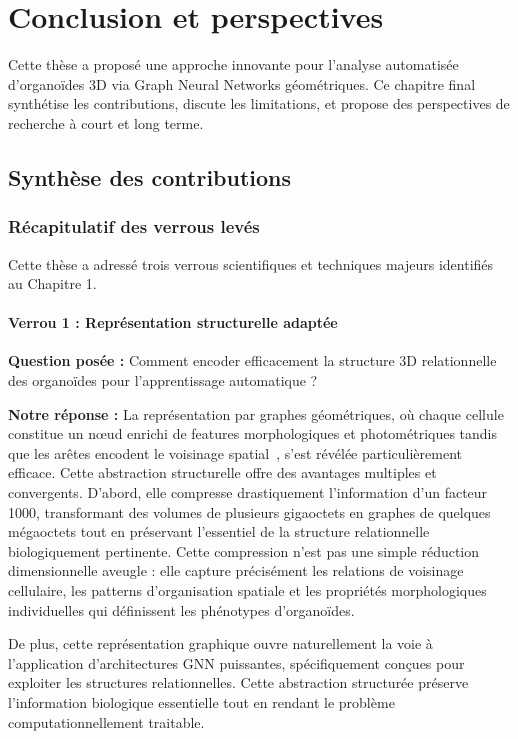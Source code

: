 
\chapter{Conclusion et perspectives}

Cette thèse a proposé une approche innovante pour l'analyse automatisée d'organoïdes 3D via Graph Neural Networks géométriques. Ce chapitre final synthétise les contributions, discute les limitations, et propose des perspectives de recherche à court et long terme.

\section{Synthèse des contributions}

\subsection{Récapitulatif des verrous levés}

Cette thèse a adressé trois verrous scientifiques et techniques majeurs identifiés au Chapitre 1.

\subsubsection{Verrou 1 : Représentation structurelle adaptée}

\textbf{Question posée :} Comment encoder efficacement la structure 3D relationnelle des organoïdes pour l'apprentissage automatique ?

\textbf{Notre réponse :}
La représentation par graphes géométriques, où chaque cellule constitue un nœud enrichi de features morphologiques et photométriques tandis que les arêtes encodent le voisinage spatial~\cite{Schurch2020}, s'est révélée particulièrement efficace. Cette abstraction structurelle offre des avantages multiples et convergents. D'abord, elle compresse drastiquement l'information d'un facteur 1000, transformant des volumes de plusieurs gigaoctets en graphes de quelques mégaoctets tout en préservant l'essentiel de la structure relationnelle biologiquement pertinente. Cette compression n'est pas une simple réduction dimensionnelle aveugle : elle capture précisément les relations de voisinage cellulaire, les patterns d'organisation spatiale et les propriétés morphologiques individuelles qui définissent les phénotypes d'organoïdes. 

De plus, cette représentation graphique ouvre naturellement la voie à l'application d'architectures GNN puissantes, spécifiquement conçues pour exploiter les structures relationnelles. Cette abstraction structurée préserve l'information biologique essentielle tout en rendant le problème computationnellement traitable.

